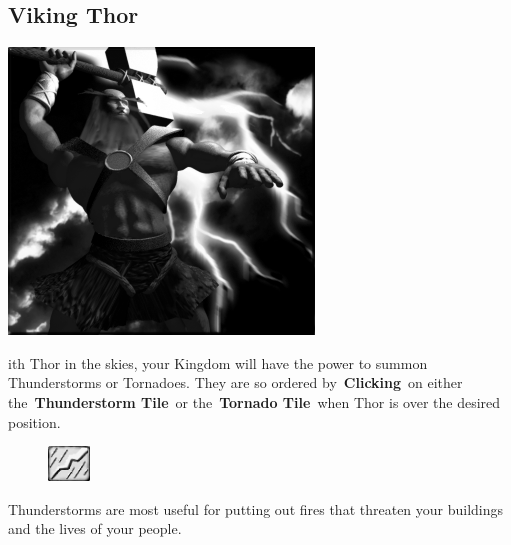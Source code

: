 \subsection{Viking Thor}


\begin{center}
	\includegraphics[width=.9\linewidth]{Athor}
\end{center}

ith Thor in the skies, your Kingdom will have the power to summon Thunderstorms or Tornadoes. They are so ordered by \textbf{Clicking} on either the \textbf{Thunderstorm Tile} or the \textbf{Tornado Tile} when Thor is over the desired position.

\begin{figure}
	\vspace{-20pt}
	\begin{center}
		\includegraphics[width=0.1\textwidth]{Train}
	\end{center}
	\vspace{-20pt}
\end{figure}

Thunderstorms are most useful for putting out fires that threaten your buildings and the lives of your people. \\

